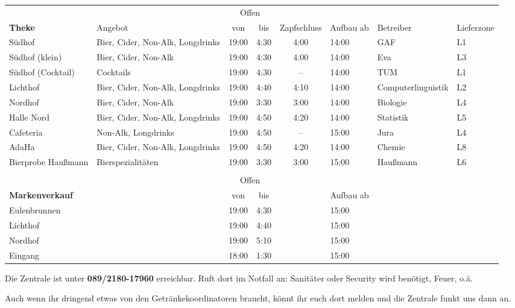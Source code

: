 \begin{center}
  \begin{tabular}{p{2cm}p{4cm}cccp{1.1cm}p{2cm}p{1cm}}
    & & \multicolumn{2}{c}{Offen} \\
    \multirow{-2}{*}{\textbf{Theke}} & \multirow{-2}{*}{Angebot} & von & bis & \multirow{-2}{*}{\parbox{1cm}{Zapf\-schluss}} & \multirow{-2}{*}{\parbox{1cm}{Aufbau ab}} & \multirow{-2}{*}{Betreiber} & \multirow{-2}{*}{\parbox{1cm}{Liefer\-zone}} \\ \hline \hline
    Südhof & Bier, Cider, Non-Alk, Longdrinks & 19:00 & 4:30 & 4:00 & 14:00 & GAF & L1 \\ \hline
    Südhof (klein) & Bier, Cider, Non-Alk & 19:00 & 4:30 & 4:00 & 14:00 & Eva & L3 \\ \hline
    Südhof (Cocktail) & Cocktails & 19:00 & 4:30 & -- & 14:00 & TUM & L1 \\ \hline
    Lichthof & Bier, Cider, Non-Alk, Longdrinks & 19:00 & 4:40 & 4:10 & 14:00 & Computer\-linguistik & L2 \\ \hline
    Nordhof & Bier, Cider, Non-Alk & 19:00 & 3:30 & 3:00 & 14:00 & Biologie & L4 \\ \hline
    Halle Nord & Bier, Cider, Non-Alk, Longdrinks & 19:00 & 4:50 & 4:20 & 14:00 & Statistik & L5 \\ \hline
    Cafeteria & Non-Alk, Longdrinks & 19:00 & 4:50 & -- & 15:00 & Jura & L4 \\ \hline %
    AdaHa & Bier, Cider, Non-Alk, Longdrinks & 19:00 & 4:50 & 4:20 & 14:00 & Chemie & L8 \\ \hline
    Bierprobe Haußmann & Bierspezialitäten & 19:00 & 3:30 & 3:00 & 15:00 & Haußmann & L6 \\ \\
                        & & \multicolumn{2}{c}{Offen} \\
    \multirow{-2}{*}{\textbf{Markenverkauf}} & & von & bis & & \multirow{-2}{*}{\parbox{1cm}{Aufbau ab}} \\ \hline \hline
    Eulenbrunnen & & 19:00 & 4:30 & & 15:00 \\
    Lichthof & & 19:00 & 4:40 & & 15:00 \\
    Nordhof & & 19:00 & 5:10 & & 15:00 \\
    Eingang & & 18:00 & 1:30 & & 15:00
  \end{tabular}
\end{center}

Die Zentrale ist unter \textbf{089/2180-17960} erreichbar. Ruft dort im Notfall an: Sanitäter oder Security wird benötigt, Feuer, o.ä.

Auch wenn ihr dringend etwas von den Getränkekoordinatoren braucht, könnt ihr euch dort melden und die Zentrale funkt uns dann an.
